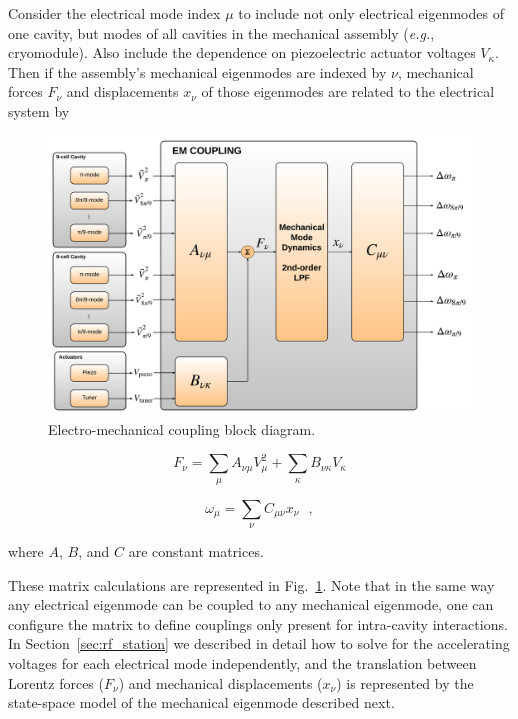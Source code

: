 \documentclass[a4paper,12pt]{article}
\begin{document}
Consider the electrical mode index $\mu$ to include not only electrical eigenmodes of one cavity, but modes of all cavities in the mechanical assembly ({\it e.g.}, cryomodule). Also include the dependence on piezoelectric actuator voltages $V_\kappa$. Then if the assembly's mechanical eigenmodes are indexed by $\nu$, mechanical forces $F_\nu$ and displacements $x_\nu$ of those eigenmodes are related to the electrical system by

\begin{figure}
\centering
\includegraphics[scale=0.25]{../figures/EM_Coupling_blocks.png}
\caption{Electro-mechanical coupling block diagram.}
\label{fig:EM_couplings}
\end{figure}

\begin{equation}
F_\nu = \sum_\mu A_{\nu\mu} V_\mu^2 + \sum_\kappa B_{\nu\kappa}V_\kappa
\label{eq:F_nu}
\end{equation}

\begin{equation}
\omega_\mu = \sum_\nu C_{\mu\nu} x_\nu~~~,
\label{eq:omega_mu}
\end{equation}

\noindent where $A$, $B$, and $C$ are constant matrices.

These matrix calculations are represented in Fig.~\ref{fig:EM_couplings}. Note that in the same way any electrical eigenmode can be coupled to any mechanical eigenmode, one can configure the matrix to define couplings only present for intra-cavity interactions. In Section~\ref{sec:rf_station} we described in detail how to solve for the accelerating voltages for each electrical mode independently, and the translation between Lorentz forces ($F_\nu$) and mechanical displacements ($x_\nu$) is represented by the state-space model of the mechanical eigenmode described next.
\end{document}
